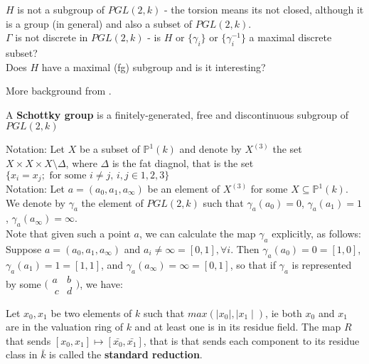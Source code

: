  $H$ is not a subgroup of $PGL(2,k)$ - the torsion means its not closed, although it is a group (in general) and also a subset of $PGL(2,k)$. \\
 $\Gamma$ is not discrete in $PGL(2,k)$ - is $H$ or $\{\gamma_i\}$ or $\{\gamma_i^{-1}\}$ a maximal discrete subset?\\
 Does $H$ have a maximal (fg) subgroup and is it interesting?

More background from \cite{gvdp}. 


\begin{definition*} \cite{gvdp} A \textbf{Schottky group} is a finitely-generated, free and discontinuous subgroup of  $PGL(2,k)$
\end{definition*}

Notation: Let $X$ be a subset of $\mathbb{P}^1(k)$ and denote by $X^{(3)}$ the set $X \times X \times X \setminus \Delta$, where $\Delta$ is the fat diagnol, that is the set $\{ x_i = x_j; \text{ for some } i \neq j \text{, } i,j \in 1,2,3\}$\\

Notation: Let $a =(a_0, a_1,a_\infty)$ be an element of $X^{(3)}$ for some $X \subseteq \mathbb{P}^1(k)$. We denote by $\gamma_a$ the element of $PGL(2,k)$ such that $\gamma_a(a_0) = 0$,  $\gamma_a(a_1) = 1$,  $\gamma_a(a_\infty) = \infty$.\\ 

Note that given such a point $a$, we can calculate the map $\gamma_a$ explicitly, as follows: Suppose  $a =(a_0, a_1,a_\infty)$ and $a_i \neq \infty = [0,1], \forall i$. Then $\gamma_a(a_0) = 0 =[1,0]$, $\gamma_a(a_1) = 1 =[1,1]$, and $\gamma_a(a_\infty) = \infty =[0,1]$, so that if $\gamma_a$ is represented by some  $\bigl( \begin{smallmatrix}a & b\\\ c & d \end{smallmatrix}\bigr)$, we have:
 
\begin{definition*}
Let $x_0, x_1$ be two elements of $k$ such that $max(\mid x_0 \mid, \mid x_1 \mid)$, ie both $x_0$ and $x_1$ are in the valuation ring of $k$ and at least one is in its residue field.  The map $R$ that sends $[x_0,x_1] \mapsto [\bar{x_0}, \bar{x_1}]$, that is that sends each component to its residue class in $\bar{k}$ is called the \textbf{standard reduction}.
\end{definition*}





